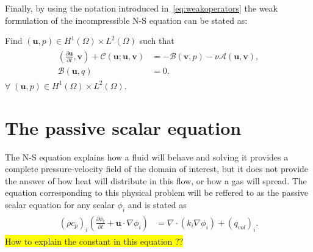 Finally, by using the notation introduced in~\ref{eq:weakoperators} the weak formulation of the incompressible
N-S equation can be stated as: 

Find $(\mathbf{u}, p) \in H^1(\Omega)\times L^2(\Omega)$ such that 
\begin{align}
    \begin{split}
        (\frac{\partial \mathbf{u}}{\partial t},\mathbf{v})
        + \mathcal{C}(\mathbf{u};\mathbf{u},\mathbf{v})
        &= -\mathcal{B}(\mathbf{v},p) 
        -\nu\mathcal{A}(\mathbf{u},\mathbf{v}), \\
        \mathcal{B}(\mathbf{u},q) &= 0.
    \end{split}
	\label{eq:NSweak}
\end{align}
$\forall\; (\mathbf{u}, p) \in H^1(\Omega)\times L^2(\Omega)$.


%
\section{The passive scalar equation}
The N-S equation explains how a fluid will behave and solving it provides a complete pressure-velocity field of the 
domain of interest, but it does not provide the answer of how heat will distribute in this flow, or how a gas will spread.
The equation corresponding to this physical problem will be reffered to as the passive scalar equation for any scalar 
$\phi_i$ and is stated as 
\begin{align}
    \begin{split}
        (\rho c_p)_i(\frac{\partial \phi_i}{\partial t} + \mathbf{u}\cdot \nabla\phi_i) 
        &= \nabla \cdot(k_i\nabla \phi_i)+ (q_{vol})_i.
    \end{split}
	\label{eq:PS}
\end{align}
\colorbox{yellow}{How to explain the constant in this equation ??} 
